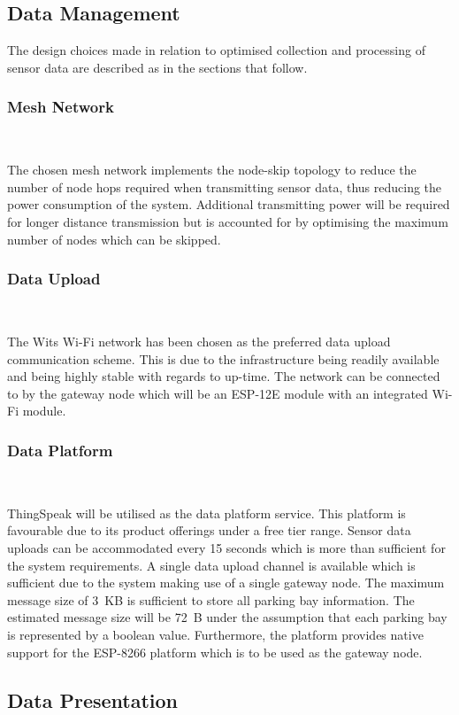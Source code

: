 \documentclass[10pt,twocolumn]{witseiepaper}
\begin{document}
	\subsection{Data Management}
		The design choices made in relation to optimised collection and processing of sensor data are described as in the sections that follow.
	
	\subsubsection{Mesh Network} $   $
	
		The chosen mesh network implements the node-skip topology to reduce the number of node hops required when transmitting sensor data, thus reducing the power consumption of the system. Additional transmitting power will be required for longer distance transmission but is accounted for by optimising the maximum number of nodes which can be skipped.
	
	\subsubsection{Data Upload} $   $
	
		The Wits Wi-Fi network has been chosen as the preferred data upload communication scheme. This is due to the infrastructure being readily available and being highly stable with regards to up-time. The network can be connected to by the gateway node which will be an ESP-12E module with an integrated Wi-Fi module.
		
	\subsubsection{Data Platform} $   $
	
		ThingSpeak will be utilised as the data platform service. This platform is favourable due to its product offerings under a free tier range. Sensor data uploads can be accommodated every 15 seconds which is more than sufficient for the system requirements. A single data upload channel is available which is sufficient due to the system making use of a single gateway node. The maximum message size of 3~KB is sufficient to store all parking bay information. The estimated message size will be 72~B under the assumption that each parking bay is represented by a boolean value. Furthermore, the platform provides native support for the ESP-8266 platform which is to be used as the gateway node.

	\subsection{Data Presentation}
	
\end{document}
